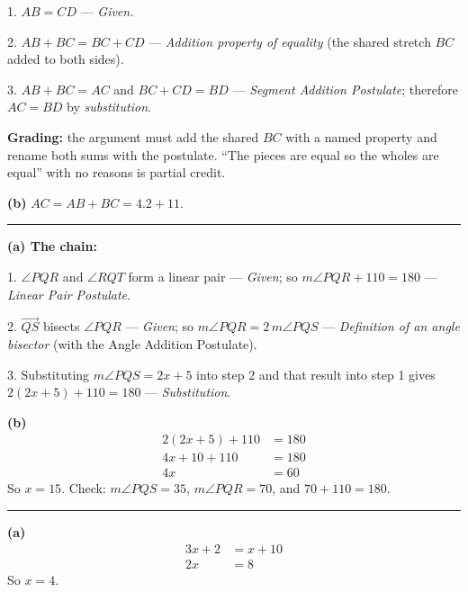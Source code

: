 \documentclass[12pt]{article}
\begin{document}
1. $AB = CD$ --- \emph{Given.}

2. $AB + BC = BC + CD$ --- \emph{Addition property of equality} (the shared stretch $BC$ added to both sides).

3. $AB + BC = AC$ and $BC + CD = BD$ --- \emph{Segment Addition Postulate}; therefore $AC = BD$ by \emph{substitution}.

\textbf{Grading:} the argument must add the shared $BC$ with a named property and rename both sums with the postulate. ``The pieces are equal so the wholes are equal'' with no reasons is partial credit.

\textbf{(b)} $AC = AB + BC = 4.2 + 11$. 

\vspace{0.2cm}\noindent\rule{\linewidth}{0.2pt}


\textbf{(a) The chain:}

1. $\angle PQR$ and $\angle RQT$ form a linear pair --- \emph{Given}; so $m\angle PQR + 110 = 180$ --- \emph{Linear Pair Postulate}.

2. $\overrightarrow{QS}$ bisects $\angle PQR$ --- \emph{Given}; so $m\angle PQR = 2\,m\angle PQS$ --- \emph{Definition of an angle bisector} (with the Angle Addition Postulate).

3. Substituting $m\angle PQS = 2x + 5$ into step 2 and that result into step 1 gives $2(2x + 5) + 110 = 180$ --- \emph{Substitution}.

\textbf{(b)}
\begin{align*}
  2(2x + 5) + 110 &= 180 \\
  4x + 10 + 110 &= 180 \\
  4x &= 60
\end{align*}
So $x = 15$. Check: $m\angle PQS = 35$, $m\angle PQR = 70$, and $70 + 110 = 180$. 

\vspace{0.2cm}\noindent\rule{\linewidth}{0.2pt}


\textbf{(a)}
\begin{align*}
  3x + 2 &= x + 10 \\
  2x &= 8
\end{align*}
So $x = 4$. 
\end{document}
